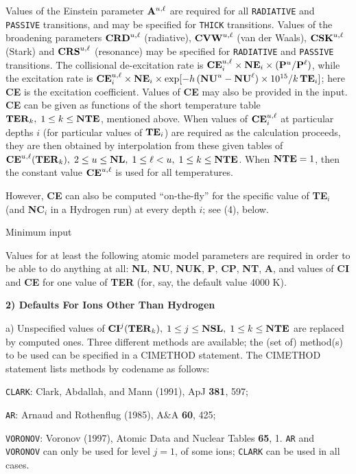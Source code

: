 Values of the Einstein parameter ${\bf A}^{u,\ell}$ are required for all
{\tt RADIATIVE} and {\tt PASSIVE} transitions, and may be specified for
{\tt THICK} transitions. Values of the broadening parameters 
${\bf CRD}^{u,\ell}$ (radiative), ${\bf CVW}^{u,\ell}$ (van der Waals),
${\bf CSK}^{u,\ell}$ (Stark) and ${\bf CRS}^{u,\ell}$ (resonance) may
be specified for {\tt RADIATIVE} and {\tt PASSIVE} transitions.
\blankline
The collisional de-excitation rate is ${\bf CE}^{u,\ell}_i \times {\bf NE}_i
\times ({\bf P}^u/{\bf P}^\ell)$, while the excitation rate is
${\bf CE}^{u,\ell}_i \times {\bf NE}_i \times \exp[-h \, ({\bf NU}^u-{\bf NU}^\ell)
\times 10^{15}/k \, {\bf TE}_i]$; here {\bf CE} is the excitation coefficient.
Values of {\bf CE} may also be provided in the input. {\bf CE} can be
given as functions of the short temperature table ${\bf TER}_k, \; 1 \leq k \leq
{\bf NTE}$, mentioned above. When values of
${\bf CE}^{u,\ell}_i$ at particular depths $i$ (\ie for particular values of
${\bf TE}_i$) are required as the calculation proceeds, they are then obtained
by interpolation from these given tables of ${\bf CE}^{u,\ell}({\bf TER}_k), 
\; 2 \leq u \leq {\bf NL}, \; 1 \leq \ell < u, \; 1 \leq k \leq {\bf NTE}$.
When ${\bf NTE} = 1$, then the constant value ${\bf CE}^{u,\ell}$ is used
for all temperatures.

However, {\bf CE} can also be computed
``on-the-fly'' for the specific value of {\bf TE}$_i$ (and {\bf NC}$_i$
in a Hydrogen run) at every depth $i$; see (4), below.
\blankline
\centerline{Minimum input}
\blankline
Values for at least the following atomic model parameters are required
in order to be able to do anything at all: {\bf NL}, {\bf NU}, {\bf NUK},
{\bf P}, {\bf CP}, {\bf NT}, {\bf A}, and values of {\bf CI} and {\bf CE}
for one value of {\bf TER} (for, say, the default value 4000 K).
\ej
\centerline{\bf 2) Defaults For Ions Other Than Hydrogen}
\blankline
a) Unspecified values of
${\bf CI}^j({\bf TER}_k), \; 1 \leq j \leq {\bf NSL}, \; 1 \leq k 
\leq {\bf NTE}$ are replaced by computed ones. Three different methods are
available; the (set of) method(s) to be used can be specified in a
CIMETHOD statement. The \break CIMETHOD statement lists methods by codename
as follows:

{\tt CLARK}: \quad Clark, Abdallah, and Mann (1991), ApJ {\bf 381}, 597;

{\tt AR}: \quad Arnaud and Rothenflug (1985), A\&A {\bf 60}, 425;

{\tt VORONOV}: \quad Voronov (1997), Atomic Data and Nuclear Tables {\bf 65}, 1. \np
{\tt AR} and {\tt VORONOV} can only be used for level $j = 1$, of some ions;
{\tt CLARK} can be used in all cases.

